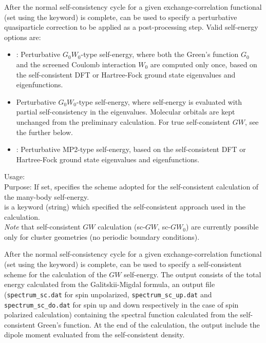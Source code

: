 After the normal self-consistency cycle for a given
exchange-correlation functional (set using the  keyword)
is complete,  can be used to specify a perturbative
quasiparticle correction to be applied as a post-processing
step. Valid self-energy options  are:
\begin{itemize}
  \item {} : Perturbative $G_0 W_0$-type self-energy, where both the
    Green's function $G_0$ and the screened Coulomb interaction $W_0$ are
    computed only once, based on the self-consistent DFT or Hartree-Fock
    ground state eigenvalues and eigenfunctions.
  \item {}  Perturbative $G_0 W_0$-type self-energy, where 
    self-energy is evaluated with partial self-consistency in the eigenvalues. 
    Molecular orbitals are kept unchanged from the preliminary
    calculation. For true self-consistent $GW$, see the
    further below.
  \item {} : Perturbative MP2-type self-energy, based on the
    self-consistent DFT or Hartree-Fock ground state eigenvalues and
    eigenfunctions.
\end{itemize}

{
 \noindent
 Usage:   \\[1.0ex]
 Purpose: If set, specifies the scheme adopted for the 
 self-consistent calculation of the many-body self-energy. \\[1.0ex]
  is a keyword (string) which specified the 
 self-consistent approach used in the calculation. \\
}
\emph{Note} that self-consistent $GW$ calculation (sc-$GW$, sc-$GW_0$) are currently possible
only for cluster geometries (no periodic boundary conditions).

After the normal self-consistency cycle for a given
exchange-correlation functional (set using the  keyword)
is complete,  can be used to specify
a self-consistent scheme for the calculation of the $GW$ self-energy.
The output consists of the total energy calculated from the Galitskii-Migdal 
formula, an output file (\texttt{spectrum\_sc.dat} for spin unpolarized, \texttt{spectrum\_sc\_up.dat} and 
 \texttt{spectrum\_sc\_do.dat} for spin up and down respectively in the case of spin polarized calculation) 
containing the spectral function calculated from the self-consistent Green's function.
At the end of the calculation, the output include the dipole 
moment evaluated from the self-consistent density.

